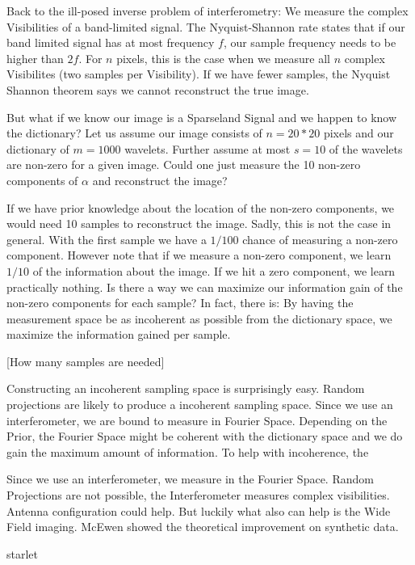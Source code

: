 Back to the ill-posed inverse problem of interferometry: We measure the complex Visibilities of a band-limited signal. The Nyquist-Shannon rate states that if our band limited signal has at most frequency $f$, our sample frequency needs to be higher than $2f$. For $n$ pixels, this is the case when we measure all $n$ complex Visibilites (two samples per Visibility). If we have fewer samples, the Nyquist Shannon theorem says we cannot reconstruct the true image.

But what if we know our image is a Sparseland Signal and we happen to know the dictionary? Let us assume our image consists of $n = 20*20$ pixels and our dictionary of $m = 1000$ wavelets. Further assume at most $s=10$ of the wavelets are non-zero for a given image. Could one just measure the 10 non-zero components of $\alpha$ and reconstruct the image? 

If we have prior knowledge about the location of the non-zero components, we would need 10 samples to reconstruct the image. Sadly, this is not the case in general. With the first sample we have a $1/100$ chance of measuring a non-zero component. However note that if we measure a non-zero component, we learn $1/10$ of the information about the image. If we hit a zero component, we learn practically nothing. Is there a way we can maximize our information gain of the non-zero components for each sample? In fact, there is: By having the measurement space be  as incoherent as possible from the dictionary space, we maximize the information gained per sample.

[How many samples are needed]

Constructing an incoherent sampling space is surprisingly easy. Random projections are likely to produce a incoherent sampling space. Since we use an interferometer, we are bound to measure in Fourier Space. Depending on the Prior, the Fourier Space might be coherent with the dictionary space and we do gain the maximum amount of information. To help with incoherence, the 

Since we use an interferometer, we measure in the Fourier Space.
Random Projections are not possible, the Interferometer measures complex visibilities. Antenna configuration could help. But luckily what also can help is the Wide Field imaging. McEwen \cite{mcewen2011compressed} showed the theoretical improvement on synthetic data.

starlet\cite{starck2015starlet}




